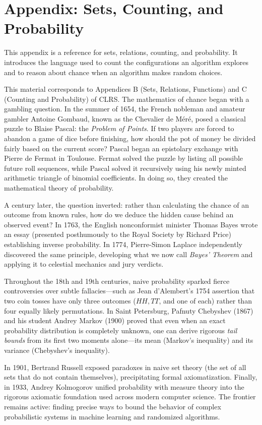 \chapter{Appendix: Sets, Counting, and Probability}
\label{ch38:sets-prob}

\providecommand{\E}{\ensuremath{\mathbb{E}}}
\providecommand{\Var}{\ensuremath{\operatorname{Var}}}

This appendix is a reference for sets, relations, counting, and probability.
It introduces the language used to count the configurations an algorithm
explores and to reason about chance when an algorithm makes random choices.

\begin{historybox}
This material corresponds to Appendices B (Sets, Relations, Functions) and C
(Counting and Probability) of CLRS.
The mathematics of chance began with a gambling question. In the summer of 1654, the French nobleman and amateur gambler
Antoine Gombaud, known as the Chevalier de M\'er\'e, posed a classical puzzle to
Blaise Pascal: the \emph{Problem of Points}. If two players are forced to abandon a
game of dice before finishing, how should the pot of money be divided fairly based
on the current score? Pascal began an epistolary exchange with Pierre de Fermat in
Toulouse. Fermat solved the puzzle by listing all possible future roll sequences,
while Pascal solved it recursively using his newly minted arithmetic triangle of
binomial coefficients. In doing so, they created the mathematical theory of probability.

A century later, the question inverted: rather than calculating the chance of an
outcome from known rules, how do we deduce the hidden cause behind an observed
event? In 1763, the English nonconformist minister Thomas Bayes wrote an essay
(presented posthumously to the Royal Society by Richard Price) establishing
inverse probability. In 1774, Pierre-Simon Laplace independently discovered the
same principle, developing what we now call \emph{Bayes' Theorem} and applying it
to celestial mechanics and jury verdicts.

Throughout the 18th and 19th centuries, naive probability sparked fierce controversies
over subtle fallacies---such as Jean d'Alembert's 1754 assertion that two coin tosses have
only three outcomes ($HH, TT$, and one of each) rather than four equally likely permutations.
In Saint Petersburg, Pafnuty Chebyshev (1867) and his student Andrey Markov (1900)
proved that even when an exact probability distribution is completely unknown, one can
derive rigorous \emph{tail bounds} from its first two moments alone---its
mean (Markov's inequality) and its variance (Chebyshev's inequality).

In 1901, Bertrand Russell exposed paradoxes in naive set theory (the set of all sets that do not contain
themselves), precipitating formal axiomatization. Finally, in 1933, Andrey Kolmogorov
unified probability with measure theory into the rigorous axiomatic foundation used across
modern computer science. The frontier remains active: finding precise ways to bound the behavior of complex
probabilistic systems in machine learning and randomized algorithms.
\end{historybox}

